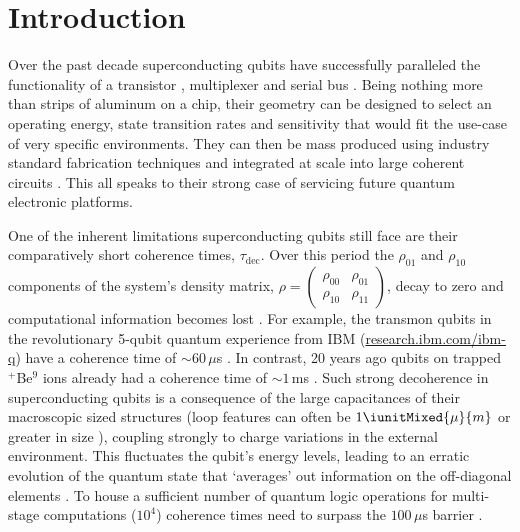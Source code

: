 
\section{Introduction}
 
\noindent Over the past decade superconducting qubits have successfully paralleled the
functionality of a transistor \cite{Astafiev2010}\cite{hoi2011}, multiplexer \cite{honigl2018}
and serial bus \cite{shen2005}. Being nothing more than strips of aluminum on a chip, their
geometry can be designed to select an operating energy, state transition rates and
sensitivity that would fit the use-case of very specific environments. They can then be mass
produced using industry standard fabrication techniques and integrated at scale into large
coherent circuits \cite{johnson2010}. This all speaks to their strong case of servicing
future quantum electronic platforms.


One of the inherent limitations superconducting qubits still face are their comparatively short coherence times, $\tau_{\text{dec}}$. Over this period the $\rho_{01}$ and $\rho_{10}$ components of the system's density matrix, $\rho = \ensuremath{\left(\begin{smallmatrix} \rho_{00} & \rho_{01} \\ \rho_{10} & \rho_{11} \end{smallmatrix}\right)} $, decay to zero and computational information becomes lost \cite{phaseExp}.
For example, the transmon qubits in the revolutionary 5-qubit quantum experience from IBM (\href{http://www.research.ibm.com/ibm-q}{research.ibm.com/ibm-q}) have a coherence time of $ \sim 60\,\mu $s \cite{linke2017}. In contrast, 20 years ago qubits on trapped $ ^{+} $Be$ ^{9} $ ions already had a coherence time of $\sim1\, $ms \cite{monroe1995}.
Such strong decoherence in superconducting qubits is a consequence of the large capacitances of their macroscopic sized structures (loop features can often be $ 1\iunitMixed{\mu}{m}$ or greater in size \cite{Astafiev2010}\cite{hoi2011}\cite{johnson2010}), coupling strongly to charge variations in the external environment.
This fluctuates the qubit's energy levels, leading to an erratic evolution of the quantum state that `averages' out information on the off-diagonal elements \cite{devoret2008}. To house a sufficient number of quantum logic operations for multi-stage computations ($ 10^4 $) coherence times need to surpass the $ 100\,\mu$s barrier
\cite{orlando1999}.
 
